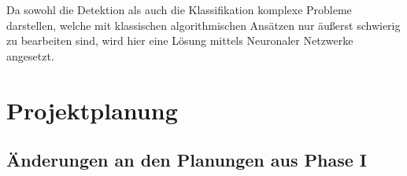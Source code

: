 \documentclass[12pt,a4paper,ngerman,enabledeprecatedfontcommands]{scrreprt}
\begin{document}
Da sowohl die Detektion als auch die Klassifikation komplexe Probleme darstellen, welche mit klassischen algorithmischen Ansätzen nur äußerst schwierig zu bearbeiten sind, wird hier eine Lösung mittels Neuronaler Netzwerke angesetzt.


\part[Projektplanung Phase II]{Projektplanung}

\chapter{Änderungen an den Planungen aus Phase I}
\end{document}
